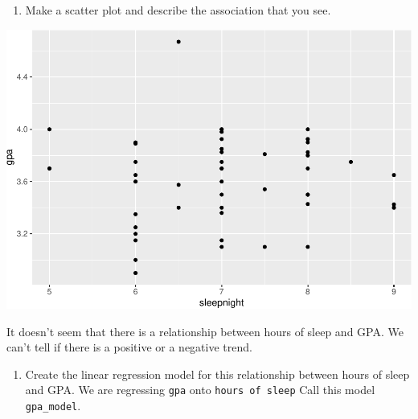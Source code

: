 \documentclass[]{article}
\newenvironment{Shaded}{\begin{snugshade}}{\end{snugshade}}
\newcommand{\DataTypeTok}[1]{\textcolor[rgb]{0.13,0.29,0.53}{#1}}
\newcommand{\KeywordTok}[1]{\textcolor[rgb]{0.13,0.29,0.53}{\textbf{#1}}}
\newcommand{\NormalTok}[1]{#1}
\newcommand{\OperatorTok}[1]{\textcolor[rgb]{0.81,0.36,0.00}{\textbf{#1}}}
\newcommand{\StringTok}[1]{\textcolor[rgb]{0.31,0.60,0.02}{#1}}
\providecommand{\tightlist}{%
  \setlength{\itemsep}{0pt}\setlength{\parskip}{0pt}}
\begin{document}
\begin{enumerate}
\def\labelenumi{\arabic{enumi}.}
\setcounter{enumi}{1}
\tightlist
\item
  Make a scatter plot and describe the association that you see.
\end{enumerate}

\begin{Shaded}
\end{Shaded}

\includegraphics{lab-8-regression_files/figure-latex/unnamed-chunk-3-1.pdf}

It doesn't seem that there is a relationship between hours of sleep and
GPA. We can't tell if there is a positive or a negative trend.

\begin{enumerate}
\def\labelenumi{\arabic{enumi}.}
\setcounter{enumi}{2}
\tightlist
\item
  Create the linear regression model for this relationship between hours
  of sleep and GPA. We are regressing \texttt{gpa} onto
  \texttt{hours\ of\ sleep} Call this model \texttt{gpa\_model}.
\end{enumerate}

\begin{Shaded}
\end{Shaded}
\end{document}
